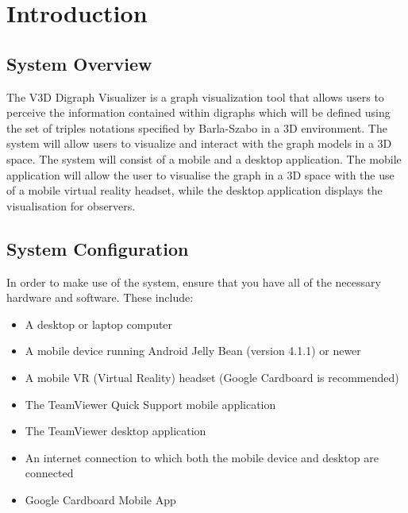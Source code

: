 \documentclass[english]{article}
\begin{document}

\newpage
{}
\thispagestyle{empty}
\tableofcontents
\clearpage

\setcounter{page}{1}

\section{Introduction}
\subsection{System Overview}
The V3D Digraph Visualizer is a graph visualization tool that allows users to perceive the information contained within digraphs which will be defined using the set of triples notations specified by Barla-Szabo in a 3D environment. The system will allow users to visualize and interact with the graph models in a 3D space. The system will consist of a mobile and a desktop application. The mobile application will allow the user to visualise the graph in a 3D space with the use of a mobile virtual reality headset, while the desktop application displays the visualisation for observers.

\subsection{System Configuration}
\begin{flushleft}
In order to make use of the system, ensure that you have all of the necessary hardware and software. These include:

\begin{itemize}
  \item A desktop or laptop computer
  \item A mobile device running Android Jelly Bean (version 4.1.1) or newer
  \item A mobile VR (Virtual Reality) headset (Google Cardboard is recommended)
  \item The TeamViewer Quick Support mobile application
  \item The TeamViewer desktop application
  \item An internet connection to which both the mobile device and desktop are connected
  \item Google Cardboard Mobile App
\end{itemize}
\end{flushleft}
\end{document}
